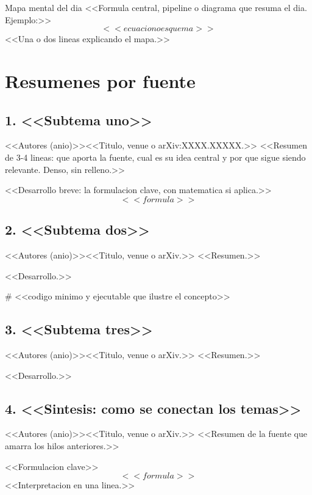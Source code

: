 \begin{concept}{Mapa mental del dia}
<<Formula central, pipeline o diagrama que resuma el dia. Ejemplo:>>
\[
  <<ecuacion o esquema>>
\]
<<Una o dos lineas explicando el mapa.>>
\end{concept}

\section{Resumenes por fuente}

\subsection{1. <<Subtema uno>>}
\begin{sourcecard}{<<Autores (anio)>>}{<<Titulo, venue o arXiv:XXXX.XXXXX.>>}
<<Resumen de 3-4 lineas: que aporta la fuente, cual es su idea central y por que
sigue siendo relevante. Denso, sin relleno.>>
\end{sourcecard}
<<Desarrollo breve: la formulacion clave, con matematica si aplica.>>
\[
  <<formula>>
\]

\subsection{2. <<Subtema dos>>}
\begin{sourcecard}{<<Autores (anio)>>}{<<Titulo, venue o arXiv.>>}
<<Resumen.>>
\end{sourcecard}
<<Desarrollo.>>

\begin{code}
# <<codigo minimo y ejecutable que ilustre el concepto>>
\end{code}

\subsection{3. <<Subtema tres>>}
\begin{sourcecard}{<<Autores (anio)>>}{<<Titulo, venue o arXiv.>>}
<<Resumen.>>
\end{sourcecard}
<<Desarrollo.>>

\subsection{4. <<Sintesis: como se conectan los temas>>}
\begin{sourcecard}{<<Autores (anio)>>}{<<Titulo, venue o arXiv.>>}
<<Resumen de la fuente que amarra los hilos anteriores.>>
\end{sourcecard}
\begin{concept}{<<Formulacion clave>>}
\[
  <<formula>>
\]
<<Interpretacion en una linea.>>
\end{concept}

